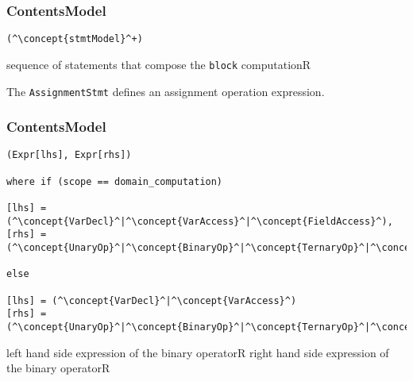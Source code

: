 \subsubsection*{ContentsModel}{}

\begin{lstlisting}[style=default]
(^\concept{stmtModel}^+)
\end{lstlisting}

\begin{HIRChildElements}
	{sequence of statements that compose the {\tt block} computation}{R}
\end{HIRChildElements}


The {\tt AssignmentStmt} defines an assignment operation expression.

\subsubsection*{ContentsModel}{}

\begin{lstlisting}[style=default]
(Expr[lhs], Expr[rhs])

where if (scope == domain_computation)

[lhs] = (^\concept{VarDecl}^|^\concept{VarAccess}^|^\concept{FieldAccess}^),
[rhs] =	(^\concept{UnaryOp}^|^\concept{BinaryOp}^|^\concept{TernaryOp}^|^\concept{Literal}^|^\concept{FieldAccess}^)

else

[lhs] = (^\concept{VarDecl}^|^\concept{VarAccess}^)
[rhs] =	(^\concept{UnaryOp}^|^\concept{BinaryOp}^|^\concept{TernaryOp}^|^\concept{Literal}^)
\end{lstlisting}


\begin{HIRChildElements}
	\HIRElementDef{[lhs]}
	{left hand side expression of the binary operator}{R}
	\HIRElementDef{[rhs]}
	{right hand side expression of the binary operator}{R}
\end{HIRChildElements}
